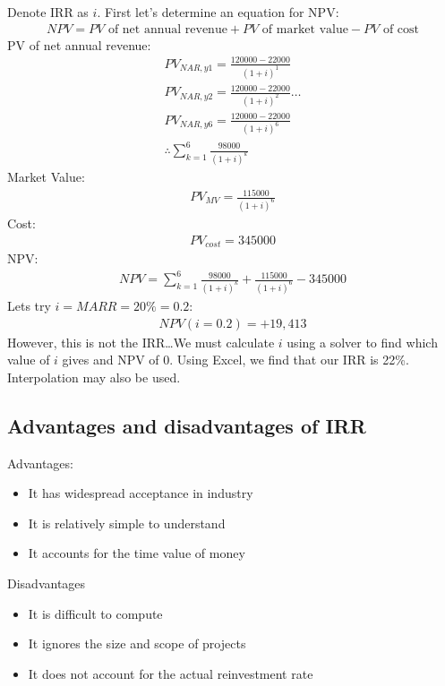 Denote IRR as $i$. First let's determine an equation for NPV:
\begin{gather}
  NPV = PV \textrm{ of net annual revenue} + PV \textrm{ of market value} - PV \textrm{ of cost}
\end{gather}
PV of net annual revenue:
\begin{gather}
  PV_{NAR,y1} = \frac{120000-22000}{(1+i)^1}\\
  PV_{NAR,y2} = \frac{120000-22000}{(1+i)^2}\dots\\
  PV_{NAR,y6} = \frac{120000-22000}{(1+i)^6}\\
  \therefore \sum_{k=1}^6 \frac{98000}{(1+i)^k}
\end{gather}
Market Value:
\begin{gather}
  PV_{MV} = \frac{115000}{(1+i)^6}
\end{gather}
Cost:
\begin{gather}
  PV_{cost} = 345000
\end{gather}
NPV:
\begin{gather}
  NPV = \sum_{k=1}^6 \frac{98000}{(1+i)^k} + \frac{115000}{(1+i)^6} - 345000
\end{gather}
Lets try $i = MARR = 20\% = 0.2$:
\begin{gather}
  NPV(i=0.2) = + 19,413
\end{gather}
However, this is not the IRR\dots We must calculate $i$ using a solver to find which value of $i$ gives and NPV of 0. Using Excel, we find that our IRR is 22\%. Interpolation may also be used.
\subsection{Advantages and disadvantages of IRR}
Advantages:
\begin{itemize}
  \item It has widespread acceptance in industry
  \item It is relatively simple to understand
  \item It accounts for the time value of money
\end{itemize}
Disadvantages
\begin{itemize}
  \item It is difficult to compute
  \item It ignores the size and scope of projects
  \item It does not account for the actual reinvestment rate
\end{itemize}
